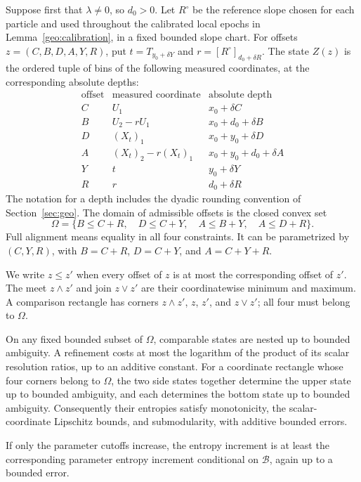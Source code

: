Suppose first that $\lambda\ne0$, so $d_0>0$.  Let $R^\circ$ be the
reference slope chosen for each particle and used throughout the
calibrated local epochs in Lemma~\ref{geo:calibration}, in a fixed
bounded slope chart.  For offsets $z=(C,B,D,A,Y,R)$, put
$t=T_{y_0+\delta Y}$ and $r=[R^\circ]_{d_0+\delta R}$.
The state $Z(z)$ is the ordered tuple of bins of the following
measured coordinates, at the corresponding absolute depths:
\begin{equation}\label{eq:source-9}
\begin{array}{c|c|c}
\text{offset}&\text{measured coordinate}&\text{absolute depth}\\ \hline
C&U_1&x_0+\delta C\\
B&U_2-rU_1&x_0+d_0+\delta B\\
D&(X_t)_1&x_0+y_0+\delta D\\
A&(X_t)_2-r(X_t)_1&x_0+y_0+d_0+\delta A\\
Y&t&y_0+\delta Y\\
R&r&d_0+\delta R
\end{array}
\end{equation}
The notation for a depth includes the
dyadic rounding convention of Section~\ref{sec:geo}.
The domain of admissible offsets is the closed convex set
\begin{equation}\label{eq:source-10}
\Omega=\{B\leq C+R,\quad D\leq C+Y,\quad
                  A\leq B+Y,\quad A\leq D+R\}.
\end{equation}
Full alignment means equality in all four constraints.  It can be
parametrized by $(C,Y,R)$, with
$B=C+R$, $D=C+Y$, and $A=C+Y+R$.

We write $z\leq z'$ when every offset of $z$ is at most the
corresponding offset of $z'$.  The meet $z\wedge z'$ and join
$z\vee z'$ are their coordinatewise minimum and maximum.
A comparison rectangle has corners $z\wedge z'$, $z$, $z'$,
and $z\vee z'$; all four must belong to $\Omega$.

\begin{lemma}\label{ent:finite-states}
On any fixed bounded subset of $\Omega$, comparable states are nested
up to bounded ambiguity.  A refinement costs at most the logarithm of
the product of its scalar resolution ratios, up to an additive
constant.  For a coordinate rectangle whose four corners belong to
$\Omega$, the two side states together determine the upper state up
to bounded ambiguity, and each determines the bottom state up to
bounded ambiguity.  Consequently their entropies satisfy monotonicity,
the scalar-coordinate Lipschitz bounds, and submodularity, with
additive bounded errors.

If only the parameter cutoffs increase, the entropy increment is at
least the corresponding parameter entropy increment conditional on
$\mathcal B$, again up to a bounded error.
\end{lemma}

